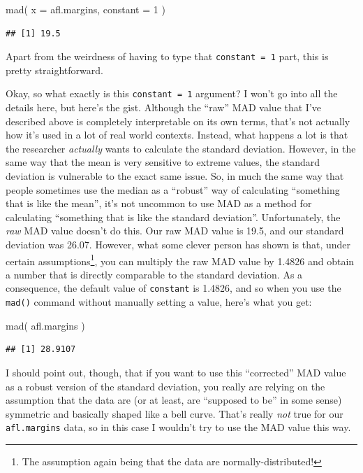 \documentclass[
]{book}
\newenvironment{Shaded}{\begin{snugshade}}{\end{snugshade}}
\newcommand{\AttributeTok}[1]{\textcolor[rgb]{0.77,0.63,0.00}{#1}}
\newcommand{\DecValTok}[1]{\textcolor[rgb]{0.00,0.00,0.81}{#1}}
\newcommand{\FunctionTok}[1]{\textcolor[rgb]{0.00,0.00,0.00}{#1}}
\newcommand{\NormalTok}[1]{#1}
\begin{document}
\begin{Shaded}
\begin{Highlighting}[]
\FunctionTok{mad}\NormalTok{( }\AttributeTok{x =}\NormalTok{ afl.margins, }\AttributeTok{constant =} \DecValTok{1}\NormalTok{ )}
\end{Highlighting}
\end{Shaded}

\begin{verbatim}
## [1] 19.5
\end{verbatim}

Apart from the weirdness of having to type that \texttt{constant\ =\ 1} part, this is pretty straightforward.

Okay, so what exactly is this \texttt{constant\ =\ 1} argument? I won't go into all the details here, but here's the gist. Although the ``raw'' MAD value that I've described above is completely interpretable on its own terms, that's not actually how it's used in a lot of real world contexts. Instead, what happens a lot is that the researcher \emph{actually} wants to calculate the standard deviation. However, in the same way that the mean is very sensitive to extreme values, the standard deviation is vulnerable to the exact same issue. So, in much the same way that people sometimes use the median as a ``robust'' way of calculating ``something that is like the mean'', it's not uncommon to use MAD as a method for calculating ``something that is like the standard deviation''. Unfortunately, the \emph{raw} MAD value doesn't do this. Our raw MAD value is 19.5, and our standard deviation was 26.07. However, what some clever person has shown is that, under certain assumptions\footnote{The assumption again being that the data are normally-distributed!}, you can multiply the raw MAD value by 1.4826 and obtain a number that is directly comparable to the standard deviation. As a consequence, the default value of \texttt{constant} is 1.4826, and so when you use the \texttt{mad()} command without manually setting a value, here's what you get:

\begin{Shaded}
\begin{Highlighting}[]
\FunctionTok{mad}\NormalTok{( afl.margins )}
\end{Highlighting}
\end{Shaded}

\begin{verbatim}
## [1] 28.9107
\end{verbatim}

I should point out, though, that if you want to use this ``corrected'' MAD value as a robust version of the standard deviation, you really are relying on the assumption that the data are (or at least, are ``supposed to be'' in some sense) symmetric and basically shaped like a bell curve. That's really \emph{not} true for our \texttt{afl.margins} data, so in this case I wouldn't try to use the MAD value this way.
\end{document}
